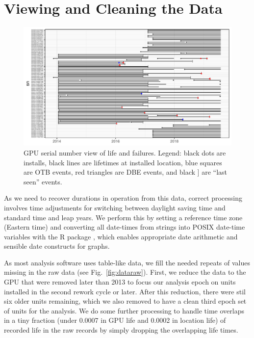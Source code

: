 \section{Viewing and Cleaning the Data}
\label{section:dataclean}
\begin{figure}[bt]
  \includegraphics[width=6.5in]{figs/sample_sn.pdf}
  \caption{GPU serial number view of life and failures. Legend: black
    dots are installs, black lines are lifetimes at installed
    location, blue squares are OTB events, red triangles are DBE
    events, and black ] are ``last seen'' events.}
  \label{fig:gpuview}
\end{figure}
As we need to recover durations in operation from this data, correct
processing involves time adjustments for switching between daylight
saving time and standard time and leap years. We perform this by
setting a reference time zone (Eastern time) and converting all
date-times from strings into POSIX date-time variables with the R
 package \cite{lubridate}, which enables appropriate
date arithmetic and sensible date constructs for graphs.

As most analysis software uses table-like data, we fill the needed
repeats of values missing in the raw data (see
Fig.~\ref{fig:dataraw}). First, we reduce the data to the GPU that
were removed later than 2013 to focus our analysis epoch on units
installed in the second rework cycle or later. After this reduction,
there were stil six older units remaining, which we also removed to
have a clean third epoch set of units for the analysis. We do some
further processing to handle time overlaps in a tiny fraction (under
0.0007 in GPU life and 0.0002 in location life) of recorded life in
the raw records by simply dropping the overlapping life times.

